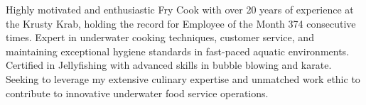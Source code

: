 \begin{cvparagraph}
Highly motivated and enthusiastic Fry Cook with over 20 years of experience at the Krusty Krab, holding the record for Employee of the Month 374 consecutive times. Expert in underwater cooking techniques, customer service, and maintaining exceptional hygiene standards in fast-paced aquatic environments. Certified in Jellyfishing with advanced skills in bubble blowing and karate. Seeking to leverage my extensive culinary expertise and unmatched work ethic to contribute to innovative underwater food service operations.
\end{cvparagraph}

